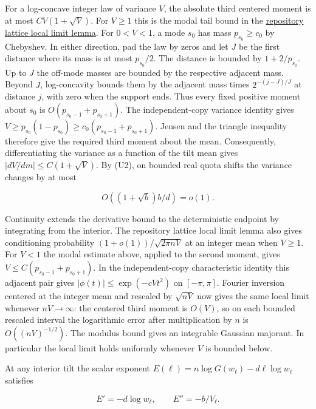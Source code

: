 For a log-concave integer law of variance $V$, the absolute third centered moment is at most $C V(1+\sqrt V)$. For $V\ge1$ this is the modal tail bound in the \href{https://github.com/ProgramComputer/open-math-research/blob/605cc467a5be93a8408519da331e46f1008df96e/topics/balanced-arrays/dense-regime/uniform-lattice-lemma.md}{repository lattice local limit lemma}. For $0<V<1$, a mode $s_0$ has mass $p_{s_0}\ge c_0$ by Chebyshev. In either direction, pad the law by zeros and let $J$ be the first distance where its mass is at most $p_{s_0}/2$. The distance is bounded by $1+2/p_{s_0}$. Up to $J$ the off-mode masses are bounded by the respective adjacent mass. Beyond $J$, log-concavity bounds them by the adjacent mass times $2^{-(j-J)/J}$ at distance $j$, with zero when the support ends. Thus every fixed positive moment about $s_0$ is $O(p_{s_0-1}+p_{s_0+1})$. The independent-copy variance identity gives $V\ge p_{s_0}(1-p_{s_0})\ge c_0(p_{s_0-1}+p_{s_0+1})$. Jensen and the triangle inequality therefore give the required third moment about the mean. Consequently, differentiating the variance as a function of the tilt mean gives $|dV/dm|\le C(1+\sqrt V)$. By (U2), on bounded real quota shifts the variance changes by at most

\begin{equation}
O((1+\sqrt b)b/d)=o(1).
\tag{U3}
\end{equation}

Continuity extends the derivative bound to the deterministic endpoint by integrating from the interior. The repository lattice local limit lemma also gives conditioning probability $(1+o(1))/\sqrt{2\pi nV}$ at an integer mean when $V\ge1$. For $V<1$ the modal estimate above, applied to the second moment, gives $V\le C(p_{s_0-1}+p_{s_0+1})$. In the independent-copy characteristic identity this adjacent pair gives $|\phi(t)|\le\exp(-cVt^2)$ on $[-\pi,\pi]$. Fourier inversion centered at the integer mean and rescaled by $\sqrt{nV}$ now gives the same local limit whenever $nV\to\infty$: the centered third moment is $O(V)$, so on each bounded rescaled interval the logarithmic error after multiplication by $n$ is $O((nV)^{-1/2})$. The modulus bound gives an integrable Gaussian majorant. In particular the local limit holds uniformly whenever $V$ is bounded below.

At any interior tilt the scalar exponent $E(\ell)=n\log G(w_\ell)-d\ell\log w_\ell$ satisfies

\begin{equation}
E'=-d\log w_\ell,\qquad E''=-b/V_\ell.
\tag{U4}
\end{equation}

